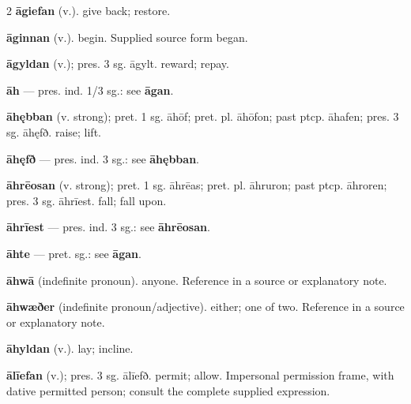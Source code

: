 \begin{multicols*}{2}
\textbf{āgiefan} (v.). give back; restore.\par
\textbf{āginnan} (v.). begin. Supplied source form began.\par
\textbf{āgyldan} (v.); pres. 3 sg. āgylt. reward; repay.\par
\textbf{āh} — pres. ind. 1/3 sg.: see \textbf{āgan}.\par
\textbf{āhębban} (v. strong); pret. 1 sg. āhōf; pret. pl. āhōfon; past ptcp. āhafen; pres. 3 sg. āhęfð. raise; lift.\par
\textbf{āhęfð} — pres. ind. 3 sg.: see \textbf{āhębban}.\par
\textbf{āhrēosan} (v. strong); pret. 1 sg. āhrēas; pret. pl. āhruron; past ptcp. āhroren; pres. 3 sg. āhrīest. fall; fall upon.\par
\textbf{āhrīest} — pres. ind. 3 sg.: see \textbf{āhrēosan}.\par
\textbf{āhte} — pret. sg.: see \textbf{āgan}.\par
\textbf{āhwā} (indefinite pronoun). anyone. Reference in a source or explanatory note.\par
\textbf{āhwæðer} (indefinite pronoun/adjective). either; one of two. Reference in a source or explanatory note.\par
\textbf{āhyldan} (v.). lay; incline.\par
\textbf{ālīefan} (v.); pres. 3 sg. ālīefð. permit; allow. Impersonal permission frame, with dative permitted person; consult the complete supplied expression.\par

\end{multicols*}

